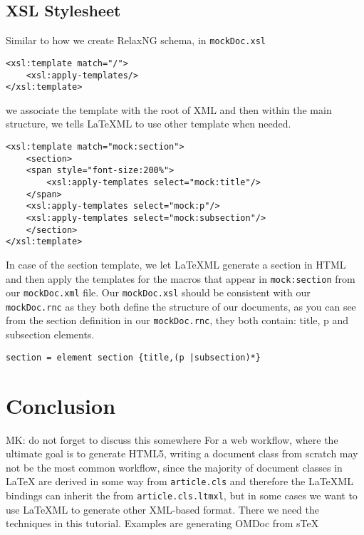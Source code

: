 \documentclass[a4paper]{article}
\def\latexml{{\LaTeX}ML\xspace}
\begin{document}
\subsection{XSL Stylesheet}
Similar to how we create RelaxNG schema, in \lstinline|mockDoc.xsl|
\begin{lstlisting}
<xsl:template match="/">
	<xsl:apply-templates/>
</xsl:template>	
\end{lstlisting}
we associate the template with the root of XML and then within the main structure, we tells \latexml to use other
template when needed.
\begin{lstlisting}
<xsl:template match="mock:section">
	<section>
	<span style="font-size:200%">
		<xsl:apply-templates select="mock:title"/>
	</span>
	<xsl:apply-templates select="mock:p"/>
	<xsl:apply-templates select="mock:subsection"/>
	</section>
</xsl:template>
\end{lstlisting}
In case of the section template, we let \latexml generate a section in HTML and then apply the templates for the macros that appear in \lstinline|mock:section| from our \lstinline|mockDoc.xml| file. Our \lstinline|mockDoc.xsl| should be consistent with our \lstinline|mockDoc.rnc| as they both define the structure of our documents, as you can see from the section definition in our \lstinline|mockDoc.rnc|, they both contain: title, p and subsection elements.
\begin{lstlisting}
section = element section {title,(p |subsection)*}
\end{lstlisting}

\section{Conclusion}\label{sec:concl}
\begin{newpart}{MK: do not forget to discuss this somewhere}
  For a web workflow, where the ultimate goal is to generate HTML5, writing a document
  class from scratch may not be the most common workflow, since the majority of document
  classes in {\LaTeX} are derived in some way from \lstinline|article.cls| and therefore
  the \latexml bindings can inherit the from \lstinline|article.cls.ltmxl|, but in some
  cases we want to use \latexml to generate other XML-based format. There we need the
  techniques in this tutorial. Examples are generating OMDoc from s\TeX{}
\end{newpart}
\end{document}
